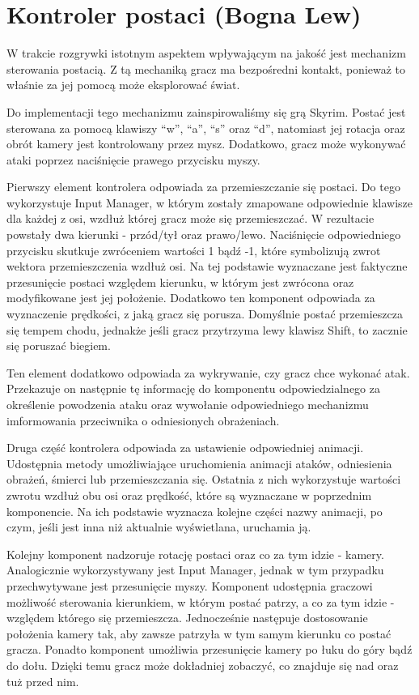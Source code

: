 \section{Kontroler postaci (Bogna Lew)}

W trakcie rozgrywki istotnym aspektem wpływającym na jakość jest mechanizm sterowania postacią. Z tą mechaniką gracz ma
bezpośredni kontakt, ponieważ to właśnie za jej pomocą może eksplorować świat.

Do implementacji tego mechanizmu zainspirowaliśmy się grą Skyrim. Postać jest sterowana za pomocą klawiszy “w”, “a”, “s”
oraz “d”, natomiast jej rotacja oraz obrót kamery jest kontrolowany przez mysz. Dodatkowo, gracz może wykonywać ataki
poprzez naciśnięcie prawego przycisku myszy.

Pierwszy element kontrolera odpowiada za przemieszczanie się postaci. Do tego wykorzystuje Input Manager, w którym zostały
zmapowane odpowiednie klawisze dla każdej z osi, wzdłuż której gracz może się przemieszczać. W rezultacie powstały dwa
kierunki - przód/tył oraz prawo/lewo. Naciśnięcie odpowiedniego przycisku skutkuje zwróceniem wartości 1 bądź -1, które
symbolizują zwrot wektora przemieszczenia wzdłuż osi. Na tej podstawie wyznaczane jest faktyczne przesunięcie postaci
względem kierunku, w którym jest zwrócona oraz modyfikowane jest jej położenie. Dodatkowo ten komponent odpowiada za
wyznaczenie prędkości, z jaką gracz się porusza. Domyślnie postać przemieszcza się tempem chodu, jednakże jeśli gracz
przytrzyma lewy klawisz Shift, to zacznie się poruszać biegiem.

Ten element dodatkowo odpowiada za wykrywanie, czy gracz chce wykonać atak. Przekazuje on następnie tę informację do
komponentu odpowiedzialnego za określenie powodzenia ataku oraz wywołanie odpowiedniego mechanizmu imformowania
przeciwnika o odniesionych obrażeniach.

Druga część kontrolera odpowiada za ustawienie odpowiedniej animacji. Udostępnia metody umożliwiające uruchomienia
animacji ataków, odniesienia obrażeń, śmierci lub przemieszczania się. Ostatnia z nich wykorzystuje wartości zwrotu wzdłuż
obu osi oraz prędkość, które są wyznaczane w poprzednim komponencie. Na ich podstawie wyznacza kolejne części nazwy
animacji, po czym, jeśli jest inna niż aktualnie wyświetlana, uruchamia ją.

Kolejny komponent nadzoruje rotację postaci oraz co za tym idzie - kamery. Analogicznie wykorzystywany jest Input
Manager, jednak w tym przypadku przechwytywane jest przesunięcie myszy. Komponent udostępnia graczowi możliwość
sterowania kierunkiem, w którym postać patrzy, a co za tym idzie - względem którego się przemieszcza. Jednocześnie
następuje dostosowanie położenia kamery tak, aby zawsze patrzyła w tym samym kierunku co postać gracza. Ponadto
komponent umożliwia przesunięcie kamery po łuku do góry bądź do dołu. Dzięki temu gracz może dokładniej zobaczyć,
co znajduje się nad oraz tuż przed nim.

